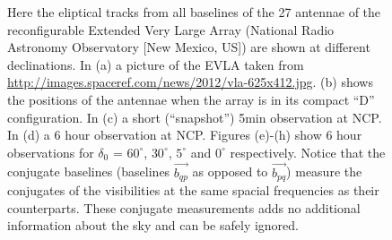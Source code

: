 \begin{figure}[h]
\begin{mdframed}
\begin{subfigure}[b]{0.32\textwidth}
  \caption{}
 \end{subfigure}
 \caption[u,v coverage]{Here the eliptical tracks from all baselines of the 27 antennae of the reconfigurable 
  Extended Very Large Array (National Radio Astronomy Observatory [New Mexico, US]) are shown at different declinations.
  In (a) a picture of the EVLA taken from \url{http://images.spaceref.com/news/2012/vla-625x412.jpg}. (b) shows the positions of the
  antennae when the array is in its compact ``D'' configuration. In (c) a 
  short (``snapshot'') 5min observation at NCP. In (d) a 6 hour observation at NCP. Figures (e)-(h) show 6 hour 
  observations for $\delta_0$ = $60^{\circ}$, $30^{\circ}$, $5^{\circ}$ and $0^{\circ}$ respectively. Notice that the conjugate baselines
  (baselines $\vec{b_{qp}}$ as opposed to $\vec{b_{pq}}$) measure the conjugates of the visibilities at the same spacial frequencies as their
  counterparts. These conjugate measurements adds no additional information about the sky and can be safely ignored.}
  \label{fig_evla_observation}
 \end{mdframed}
\end{figure}      
